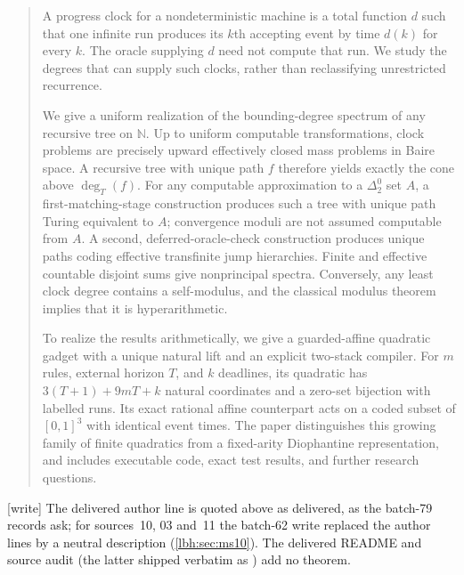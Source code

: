 \documentclass[11pt,letterpaper]{article}
\theoremstyle{definition}
\theoremstyle{remark}
\newcommand{\N}{\mathbb N}
\newcommand{\1}{\mathbf 1}
\newcommand{\csdegT}{\operatorname{deg}_{T}}
\newcommand{\wtag}{\textup{[write]}}%
\begin{document}
\begin{quote}\small
A progress clock for a nondeterministic machine is a total function $d$
such that one infinite run produces its $k$th accepting event by time
$d(k)$ for every $k$. The oracle supplying $d$ need not compute that run.
We study the degrees that can supply such clocks, rather than reclassifying
unrestricted recurrence.

We give a uniform realization of the bounding-degree spectrum of any
recursive tree on $\N$. Up to uniform computable transformations,
clock problems are precisely upward effectively closed mass problems
in Baire space. A recursive tree with unique path $f$ therefore yields
exactly the cone above $\csdegT(f)$. For any computable approximation to a
$\Delta^0_2$ set $A$, a first-matching-stage construction produces such a
tree with unique path Turing equivalent to $A$; convergence moduli are not
assumed computable from $A$. A second, deferred-oracle-check construction
produces unique paths coding effective transfinite jump hierarchies.
Finite and effective countable disjoint sums give nonprincipal spectra.
Conversely, any least clock degree contains a self-modulus, and the
classical modulus theorem implies that it is hyperarithmetic.

To realize the results arithmetically, we give a guarded-affine quadratic
gadget with a unique natural lift and an explicit two-stack compiler.
For $m$ rules, external horizon $T$, and $k$ deadlines, its quadratic has
$3(T+1)+9mT+k$ natural coordinates and a zero-set bijection with labelled
runs. Its exact rational affine counterpart acts on a coded subset of
$[0,1]^3$ with identical event times. The paper distinguishes this growing
family of finite quadratics from a fixed-arity Diophantine representation,
and includes executable code, exact test results, and further research
questions.
\end{quote}
\wtag{} The delivered author line is quoted above as delivered, as the batch-79 records ask; for
sources~10, 03 and~11 the batch-62 write replaced the author lines by a neutral description
(\cref{lbh:sec:ms10}). The delivered README and source audit (the latter shipped verbatim as
) add no theorem.
\end{document}
